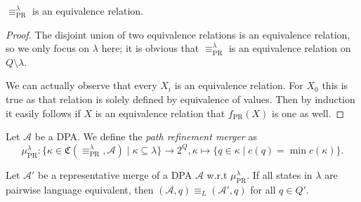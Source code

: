\vspace{5pt}

\begin{lem}
	$\equiv_\text{PR}^\lambda$ is an equivalence relation.
\end{lem}

\begin{proof}
	The disjoint union of two equivalence relations is an equivalence relation, so we only focus on $\lambda$ here; it is obvious that $\equiv_\text{PR}^\lambda$ is an equivalence relation on $Q \setminus \lambda$.
	
	We can actually observe that every $X_i$ is an equivalence relation. For $X_0$ this is true as that relation is solely defined by equivalence of values. Then by induction it easily follows if $X$ is an equivalence relation that $f_\text{PR}(X)$ is one as well.
\end{proof}

\begin{defn}
	Let $\mathcal{A}$ be a DPA. We define the \emph{path refinement merger} as $$\mu_\text{PR}^\lambda : \{ \kappa \in \mathfrak{C}(\equiv_\text{PR}^\lambda, \mathcal{A}) \mid \kappa \subseteq \lambda \} \rightarrow 2^Q, \kappa \mapsto \{ q \in \kappa \mid c(q) = \min c(\kappa) \}.$$
\end{defn}

\vspace{10pt}

\begin{theorem}
	Let $\mathcal{A}'$ be a representative merge of a DPA $\mathcal{A}$ w.r.t $\mu_\text{PR}^\lambda$. If all states in $\lambda$ are pairwise language equivalent, then $(\mathcal{A}, q) \equiv_L (\mathcal{A}', q)$ for all $q \in Q'$.
	\label{thm:pr:preserves_language}
\end{theorem}

